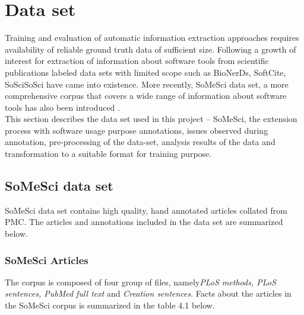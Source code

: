 \chapter{Data set}
\label{ch:dataset}
 
%
%

Training and evaluation of automatic information extraction approaches requires availability of reliable ground truth data of sufficient size. Following a growth of interest for extraction of information about software tools from scientific publications labeled data sets with limited scope such as BioNerDs, SoftCite, SoSciSoSci have came into existence. More recently, \ac{SoMeSci} data set, a more comprehensive corpus that covers a wide range of information about software tools has also been introduced \citep{schindler2021somesci}.  \\

This section describes the data set used in this project – \ac{SoMeSci},  the extension process with software usage purpose annotations, issues observed during annotation, pre-processing of the data-set, analysis results of the data and transformation to a suitable format for training purpose.  


\section{SoMeSci data set}
\label{sec:dataset:SoMeSci}

\ac{SoMeSci} data set contains high quality, hand annotated articles collated from  \ac{PMC}. The articles and annotations included in the data set are summarized below.  

\subsection{ SoMeSci Articles }
\label{subsec:dataset:SoMeSci:Articles}

The corpus is composed of four group of files, namely\emph{PLoS methods, PLoS sentences, PubMed full text} and \emph{Creation sentences}. Facts about the articles in the \ac{SoMeSci} corpus is summarized in the table 4.1 below.


